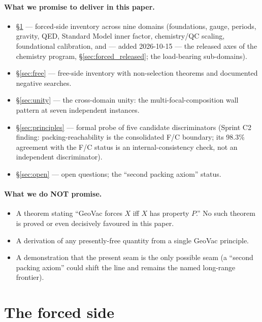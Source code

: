 \documentclass[11pt,a4paper]{article}
\theoremstyle{plain}
\theoremstyle{definition}
\begin{document}
\paragraph{What we promise to deliver in this paper.}
\begin{itemize}
  \item \S\ref{sec:forced} --- forced-side inventory across nine domains (foundations, gauge, periods, gravity, QED, Standard Model inner factor, chemistry/QC scaling, foundational calibration, and --- added 2026-10-15 --- the released axes of the chemistry program, \S\ref{sec:forced_released}; the load-bearing sub-domains).
  \item \S\ref{sec:free} --- free-side inventory with non-selection theorems and documented negative searches.
  \item \S\ref{sec:unity} --- the cross-domain unity:  the multi-focal-composition wall pattern at seven independent instances.
  \item \S\ref{sec:principles} --- formal probe of five candidate discriminators (Sprint C2 finding:  packing-reachability is the consolidated F/C boundary;  its 98.3\% agreement with the F/C status is an internal-consistency check, not an independent discriminator).
  \item \S\ref{sec:open} --- open questions; the ``second packing axiom'' status.
\end{itemize}

\paragraph{What we do NOT promise.}
\begin{itemize}
  \item A theorem stating ``GeoVac forces $X$ iff $X$ has property $P$.''  No such theorem is proved or even decisively favoured in this paper.
  \item A derivation of any presently-free quantity from a single GeoVac principle.
  \item A demonstration that the present seam is the only possible seam (a ``second packing axiom'' could shift the line and remains the named long-range frontier).
\end{itemize}

\section{The forced side}
\label{sec:forced}
\end{document}
